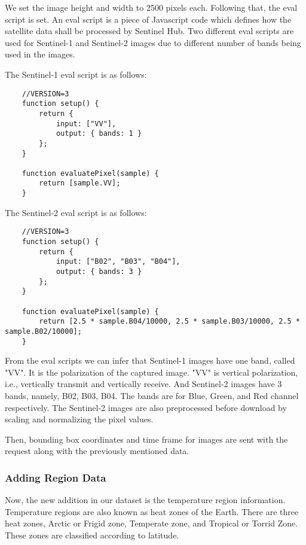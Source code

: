 We set the image height and width to 2500 pixels each. Following that, the eval script is set. An eval script is a piece of Javascript code which defines how the satellite data shall be processed by Sentinel Hub\cite{evalDoc}. Two different eval scripts are used for Sentinel-1 and Sentinel-2 images due to different number of bands being used in the images.

The Sentinel-1 eval script is as follows:

\begin{lstlisting}
    //VERSION=3
    function setup() {
        return {
            input: ["VV"],
            output: { bands: 1 }
        };
    }

    function evaluatePixel(sample) {
        return [sample.VV];
    }
\end{lstlisting}

The Sentinel-2 eval script is as follows:

\begin{lstlisting}
    //VERSION=3
    function setup() {
        return {
            input: ["B02", "B03", "B04"],
            output: { bands: 3 }
        };
    }

    function evaluatePixel(sample) {
        return [2.5 * sample.B04/10000, 2.5 * sample.B03/10000, 2.5 * sample.B02/10000];
    }
\end{lstlisting}

From the eval scripts we can infer that Sentinel-1 images have one band, called "VV". It is the polarization of the captured image. "VV" is vertical polarization, i.e.,  vertically transmit and vertically receive. And Sentinel-2 images have 3 bands, namely, B02, B03, B04. The bands are for Blue, Green, and Red channel respectively. The Sentinel-2 images are also preprocessed before download by scaling and normalizing the pixel values. 

Then, bounding box coordinates and time frame for images are sent with the request along with the previously mentioned data.

\subsubsection{Adding Region Data}
Now, the new addition in our dataset is the temperature region information. Temperature regions are also known as heat zones of the Earth. There are three heat zones, Arctic or Frigid zone, Temperate zone, and Tropical or Torrid Zone. These zones are classified according to latitude.

